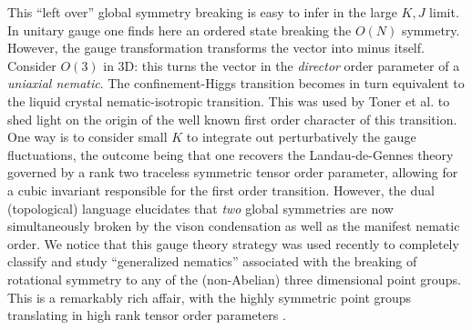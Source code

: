 This ``left over'' global symmetry breaking is easy to infer in the large $K,J$ limit. In unitary gauge one finds here an ordered state breaking the $O(N)$ symmetry. However, the gauge transformation transforms the vector into minus itself. Consider $O(3)$ in 3D: this turns the vector in the {\em director} order parameter of a {\em uniaxial nematic}. The confinement-Higgs transition becomes in turn equivalent to the liquid crystal nematic-isotropic transition. This was used by Toner et al. \cite{toner95} to shed light on the origin of the well known first order character of this transition. One way is to consider small $K$ to integrate out perturbatively the gauge fluctuations, the outcome being that one recovers the Landau-de-Gennes theory governed by a rank two traceless symmetric tensor order parameter, allowing for a cubic invariant responsible for the first order transition. However, the dual (topological) language elucidates that {\em two} global symmetries are now simultaneously broken by the vison condensation as well as the manifest nematic order. We notice that this gauge theory strategy was used recently to completely classify and study ``generalized nematics''  associated with the breaking of rotational symmetry to any of the (non-Abelian) three dimensional point groups. This is a remarkably rich affair, with the highly symmetric point groups translating in high rank tensor order parameters \cite{nonabnematic,nonabnematic1,nonabnematic2}.

